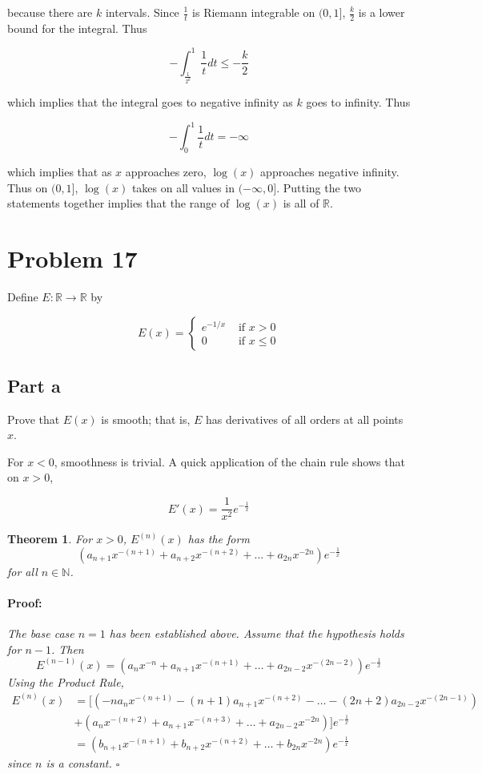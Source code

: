 \documentclass{article}
\newenvironment{proof}{\paragraph{Proof:}}{\hfill$\square$}
\newtheorem{theorem}{Theorem}
\newcommand{\R}{\mathbb{R}}
\newcommand{\N}{\mathbb{N}}
\begin{document}
because there are $k$ intervals. Since $\frac{1}{t}$ is Riemann integrable on $(0, 1]$, $\frac{k}{2}$ is a lower bound for the integral. Thus

\[
- \int_\frac{1}{2^k}^1 \frac{1}{t} dt \leq -\frac{k}{2}
\]

which implies that the integral goes to negative infinity as $k$ goes to infinity. Thus

\[
-\int_0^1 \frac{1}{t} dt = -\infty
\]

which implies that as $x$ approaches zero, $\log(x)$ approaches negative infinity. Thus on $(0, 1]$, $\log(x)$ takes on all values in $(-\infty, 0]$. Putting the two statements together implies that the range of $\log(x)$ is all of $\R$.

\section*{Problem 17}

Define $E: \R \rightarrow \R$ by

\[
E(x) =
\begin{cases}
e^{-1/x} & \text{ if } x > 0 \\
0 & \text{ if } x \leq 0
\end{cases}
\]

\subsection*{Part a}

Prove that $E(x)$ is smooth; that is, $E$ has derivatives of all orders at all points $x$.

For $x < 0$, smoothness is trivial. A quick application of the chain rule shows that on $x > 0$,

\[
E'(x) = \frac{1}{x^2} e^{-\frac{1}{x}}
\]

\begin{theorem}
\label{TheoremE(x)Form}
For $x > 0$, $E^{(n)}(x)$ has the form
\[
(a_{n+1} x^{-(n+1)} + a_{n+2}x^{-(n+2)} + \dots + a_{2n}x^{-2n})e^{-\frac{1}{x}}
\]
for all $n \in \N$.
\begin{proof}
The base case $n=1$ has been established above. Assume that the hypothesis holds for $n-1$. Then
\[
E^{(n-1)}(x) = (a_{n} x^{-n} + a_{n+1}x^{-(n+1)} + \dots + a_{2n-2}x^{-(2n-2)})e^{-\frac{1}{x}}
\]
Using the Product Rule,
\begin{align*}
E^{(n)}(x) &= [(-na_{n} x^{-(n+1)} - (n+1)a_{n+1}x^{-(n+2)} - \dots -(2n+2) a_{2n-2}x^{-(2n-1)}) \\
&+ (a_{n} x^{-(n+2)} + a_{n+1}x^{-(n+3)} + \dots + a_{2n-2}x^{-2n})]e^{-\frac{1}{x}} \\
&= (b_{n+1} x^{-(n+1)} + b_{n+2}x^{-(n+2)} + \dots + b_{2n}x^{-2n})e^{-\frac{1}{x}}
\end{align*}
since $n$ is a constant.
\end{proof}
\end{theorem}
\end{document}
